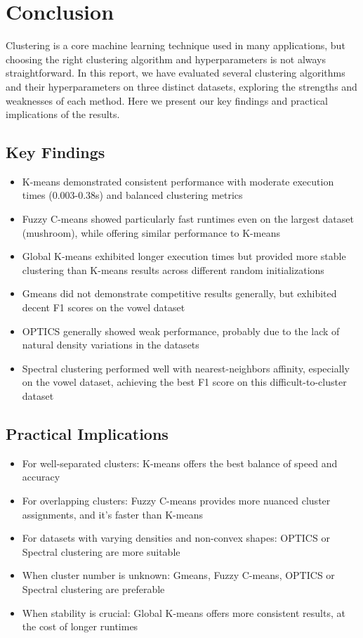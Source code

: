 \section{Conclusion}
\label{sec:conclusion}

Clustering is a core machine learning technique used in many applications, but choosing the right clustering algorithm and hyperparameters is not always straightforward. In this report, we have evaluated several clustering algorithms and their hyperparameters on three distinct datasets, exploring the strengths and weaknesses of each method. Here we present our key findings and practical implications of the results.

\subsection{Key Findings}

\begin{itemize}
    \item K-means demonstrated consistent performance with moderate execution times (0.003-0.38s) and balanced clustering metrics
    \item Fuzzy C-means showed particularly fast runtimes even on the largest dataset (mushroom), while offering similar performance to K-means
    \item Global K-means exhibited longer execution times but provided more stable clustering than K-means results across different random initializations
    \item Gmeans did not demonstrate competitive results generally, but exhibited decent F1 scores on the vowel dataset
    \item OPTICS generally showed weak performance, probably due to the lack of natural density variations in the datasets
    \item Spectral clustering performed well with nearest-neighbors affinity, especially on the vowel dataset, achieving the best F1 score on this difficult-to-cluster dataset
\end{itemize}

\subsection{Practical Implications}

\begin{itemize}
    \item For well-separated clusters: K-means offers the best balance of speed and accuracy
    \item For overlapping clusters: Fuzzy C-means provides more nuanced cluster assignments, and it's faster than K-means
    \item For datasets with varying densities and non-convex shapes: OPTICS or Spectral clustering are more suitable
    \item When cluster number is unknown: Gmeans, Fuzzy C-means, OPTICS or Spectral clustering are preferable
    \item When stability is crucial: Global K-means offers more consistent results, at the cost of longer runtimes
\end{itemize}

